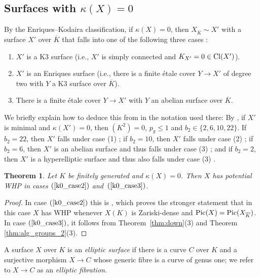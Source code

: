 \documentclass[10pt,a4paper]{amsart}
\theoremstyle{plain}
\newtheorem{theorem}{Theorem}
\theoremstyle{remark}
\numberwithin{theorem}{section}
\begin{document}
 
\subsection{Surfaces with $\kappa(X)=0$}
\label{sec:kappa0}

By the Enriques--Kodaira classification,  
if $\kappa(X)=0$,
then $X_{\overline{K}}\sim X'$
with a surface $X'$ over $\overline{K}$
that falls into one of the following three cases :
 
\begin{enumerate}
    \item\label{k0_case1} $X'$ is a K3 surface (i.e., $X'$ is simply connected and $K_{X'}=0\in{\rm Cl}(X')$).
    \item\label{k0_case2} $X'$ is an Enriques surface (i.e.,  there is a finite \'etale cover $Y\to X'$ of degree two with $Y$  a K3 surface over $\overline{K}$).  
  \item\label{k0_case3}  There is a finite \'etale cover $Y\to X'$ with $Y$ an abelian surface over $\overline{K}$. 
\end{enumerate}   
We briefly explain how to deduce this from \cite[Section 10]{Badescu} in the notation used there:
By \cite[Section~10.1, Theorem~10.2]{Badescu}, if $X'$ is minimal and $\kappa(X')=0$, then $(K^2)=0$, $p_g\leq 1$ and $b_2\in\{ 2,6,10,22\}$. 
If $b_2=22$, then $X'$ falls under case (1) \cite[Theorem~10.3]{Badescu}; 
if $b_2=10$, then $X'$ falls under case (2) \cite[Section~10.10, Proposition 10.14]{Badescu};
if $b_2=6$, then $X'$ is an abelian surface and thus falls under case (3) \cite[Theorem~10.19]{Badescu};
and if $b_2=2$, then $X'$ is a hyperelliptic surface \cite[Section~10.20]{Badescu} and thus 
also falls under case (3) \cite[Theorem~10.25]{Badescu}.

\begin{theorem}
Let $K$ be finitely generated and $\kappa(X)=0$.
Then $X$ has potential WHP in cases $(\ref{k0_case2})$ and~$(\ref{k0_case3})$.
\end{theorem}

\begin{proof}
 In case $(\ref{k0_case2})$ this is \cite[Theorem A]{GCM},
which proves the stronger statement that in this case $X$ has WHP whenever $X(K)$ is Zariski-dense
and ${\rm Pic}(X)={\rm Pic}(X_{\overline{K}})$.
  In case $(\ref{k0_case3})$, it follows from Theorem~\ref{thm:down}(3) and Theorem \ref{thm:alg_groups_2}(3).
\end{proof} 

A surface $X$ over $K$ is an \emph{elliptic surface} if there is a curve $C$ over $K$ and a surjective morphism $X\to C$ whose generic fibre is a curve of genus one; we refer to $X\to C$ as an {\em elliptic fibration}.
 
\end{document}
